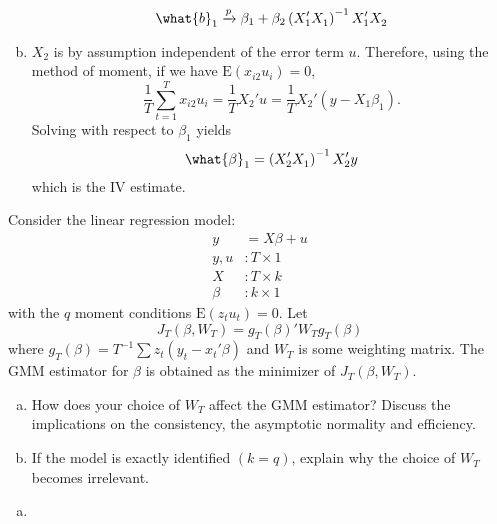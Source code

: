 \documentclass[answers]{exam}
\begin{document}
\begin{questions}
\begin{solution}
\begin{enumerate}[a)]
      \begin{equation}
        \what{b}_{1}\xrightarrow{p} \beta_{1}+\beta_{2}\left(X_{1}'X_{1}^{}\right)^{-1}X_{1}'X_{2}^{}
      \end{equation}
      \item $X_{2}$ is by assumption independent of the error term $u$. Therefore, using the method of moment, if we have $\mathrm{E}\left(x_{i2}u_{i}\right)=0$,
      \begin{equation}
        \dfrac{1}{T}\sum_{t=1}^{T}x_{i2}u_{i}=\dfrac{1}{T}X_{2}'u=\dfrac{1}{T}X_{2}'\left(y-X_{1}\beta_{1}\right).
      \end{equation}
      Solving with respect to $\beta_{1}$ yields
      \begin{equation}
        \what{\beta}_{1} = \left(X_{2}'X_{1}^{}\right)^{-1}X_{2}'y
      \end{equation}
      which is the IV estimate.
    \end{enumerate}
  \end{solution}
  \question
  Consider the linear regression model:
  \begin{align}
    y &= X\beta+u\\
    y,u &: T\times 1\\
    X &: T\times k\\
    \beta &: k\times 1
  \end{align}
  with the $q$ moment conditions $\mathrm{E}\left(z_{t}u_{t}\right)=0$. Let
  \begin{equation}
    J_{T}\left(\beta,W_{T}\right)=g_{T}\left(\beta\right)'W_{T}g_{T}\left(\beta\right)
  \end{equation}
  where $g_{T}\left(\beta\right)=T^{-1}\sum z_{t}\left(y_{t}-x_{t}'\beta\right)$ and $W_{T}$ is some weighting matrix. The GMM estimator for $\beta$ is obtained as the minimizer of $J_{T}\left(\beta,W_{T}\right)$.
  \begin{enumerate}[a)]
    \item How does your choice of $W_{T}$ affect the GMM estimator? Discuss the implications on the consistency, the asymptotic normality and efficiency.
    \item If the model is exactly identified $(k=q)$, explain why the choice of $W_{T}$ becomes irrelevant.
  \end{enumerate}
  \begin{solution}
    \begin{enumerate}[a)]
      \item 
    \end{enumerate}

\end{solution}
\end{questions}
\end{document}
